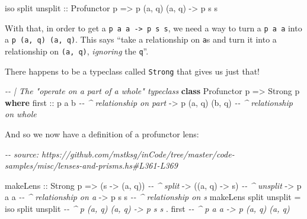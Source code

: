 \documentclass[]{article}
\newenvironment{Shaded}{}{}
\newcommand{\CommentTok}[1]{\textcolor[rgb]{0.38,0.63,0.69}{\textit{#1}}}
\newcommand{\DataTypeTok}[1]{\textcolor[rgb]{0.56,0.13,0.00}{#1}}
\newcommand{\KeywordTok}[1]{\textcolor[rgb]{0.00,0.44,0.13}{\textbf{#1}}}
\newcommand{\NormalTok}[1]{#1}
\newcommand{\OperatorTok}[1]{\textcolor[rgb]{0.40,0.40,0.40}{#1}}
\newcommand{\OtherTok}[1]{\textcolor[rgb]{0.00,0.44,0.13}{#1}}
\begin{document}
\begin{Shaded}
\begin{Highlighting}[]
\NormalTok{iso split unsplit}
\OtherTok{    ::} \DataTypeTok{Profunctor}\NormalTok{ p}
    \OtherTok{=\textgreater{}}\NormalTok{ p (a, q) (a, q)}
    \OtherTok{{-}\textgreater{}}\NormalTok{ p s s}
\end{Highlighting}
\end{Shaded}

With that, in order to get a \texttt{p\ a\ a\ -\textgreater{}\ p\ s\ s}, we need
a way to turn a \texttt{p\ a\ a} into a \texttt{p\ (a,\ q)\ (a,\ q)}. This says
``take a relationship on \texttt{a}s and turn it into a relationship on
\texttt{(a,\ q)}, \emph{ignoring} the \texttt{q}''.

There happens to be a typeclass called \texttt{Strong} that gives us just that!

\begin{Shaded}
\begin{Highlighting}[]
\CommentTok{{-}{-} | The "operate on a part of a whole" typeclass}
\KeywordTok{class} \DataTypeTok{Profunctor}\NormalTok{ p }\OtherTok{=\textgreater{}} \DataTypeTok{Strong}\NormalTok{ p }\KeywordTok{where}
\NormalTok{    first\textquotesingle{}}
\OtherTok{        ::}\NormalTok{ p a b                }\CommentTok{{-}{-} \^{} relationship on part}
        \OtherTok{{-}\textgreater{}}\NormalTok{ p (a, q) (b, q)      }\CommentTok{{-}{-} \^{} relationship on whole}
\end{Highlighting}
\end{Shaded}

And so we now have a definition of a profunctor lens:

\begin{Shaded}
\begin{Highlighting}[]
\CommentTok{{-}{-} source: https://github.com/mstksg/inCode/tree/master/code{-}samples/misc/lenses{-}and{-}prisms.hs\#L361{-}L369}

\NormalTok{makeLens}
\OtherTok{    ::} \DataTypeTok{Strong}\NormalTok{ p}
    \OtherTok{=\textgreater{}}\NormalTok{ (s }\OtherTok{{-}\textgreater{}}\NormalTok{ (a, q))        }\CommentTok{{-}{-} \^{} split}
    \OtherTok{{-}\textgreater{}}\NormalTok{ ((a, q) }\OtherTok{{-}\textgreater{}}\NormalTok{ s)        }\CommentTok{{-}{-} \^{} unsplit}
    \OtherTok{{-}\textgreater{}}\NormalTok{ p a a                }\CommentTok{{-}{-} \^{} relationship on a}
    \OtherTok{{-}\textgreater{}}\NormalTok{ p s s                }\CommentTok{{-}{-} \^{} relationship on s}
\NormalTok{makeLens split unsplit }\OtherTok{=}
\NormalTok{    iso split unsplit  }\CommentTok{{-}{-} \^{} p (a, q) (a, q) {-}\textgreater{} p s s}
  \OperatorTok{.}\NormalTok{ first\textquotesingle{}             }\CommentTok{{-}{-} \^{} p a a {-}\textgreater{} p (a, q) (a, q)}
\end{Highlighting}
\end{Shaded}
\end{document}

